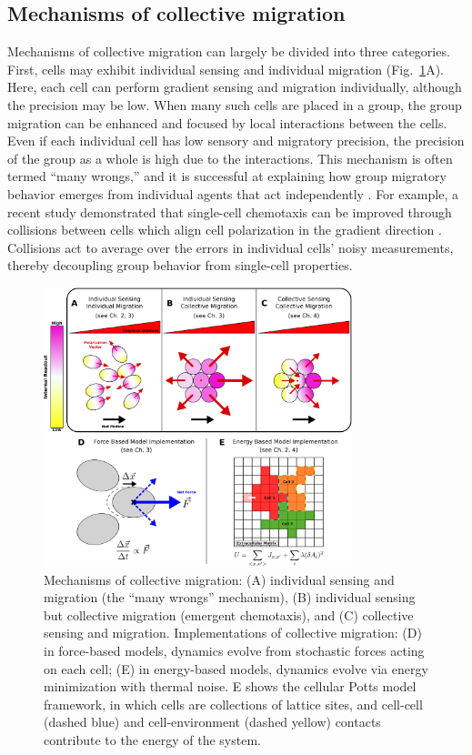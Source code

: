 \subsection{Mechanisms of collective migration}

Mechanisms of collective migration can largely be divided into three categories. First, cells may exhibit individual sensing and individual migration (Fig.\ \ref{fig:ch1_3}A). Here, each cell can perform gradient sensing and migration individually, although the precision may be low. When many such cells are placed in a group, the group migration can be enhanced and focused by local interactions between the cells. Even if each individual cell has low sensory and migratory precision, the precision of the group as a whole is high due to the interactions. This mechanism is often termed ``many wrongs,'' and it is successful at explaining how group migratory behavior emerges from individual agents that act independently \cite{simons2004many}.
For example, a recent study demonstrated that single-cell chemotaxis can be improved through collisions between cells which align cell polarization in the gradient direction \cite{coburn2013tactile}. Collisions act to average over the errors in individual cells' noisy measurements, thereby decoupling group behavior from single-cell properties.


\begin{figure}[ht]
    \centering
        \includegraphics[width=0.8\textwidth]{../fig/ch1_fig3.pdf}
    \caption{Mechanisms of collective migration: (A) individual sensing and migration (the ``many wrongs'' mechanism), (B) individual sensing but collective migration (emergent chemotaxis), and (C) collective sensing and migration. Implementations of collective migration: (D) in force-based models, dynamics evolve from stochastic forces acting on each cell; (E) in energy-based models, dynamics evolve via energy minimization with thermal noise. E shows the cellular Potts model framework, in which cells are collections of lattice sites, and cell-cell (dashed blue) and cell-environment (dashed yellow) contacts contribute to the energy of the system.}
\label{fig:ch1_3}
\end{figure}


